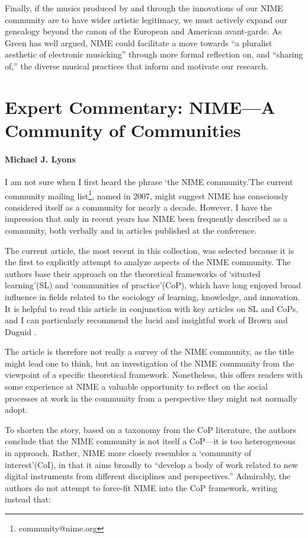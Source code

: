 Finally, if the musics produced by and through the innovations of our NIME community are to have wider artistic legitimacy, we must actively expand our genealogy beyond the canon of the European and American avant-garde. As Green \cite{Green:2015} has well argued, NIME could facilitate a move towards ``a pluralist aesthetic of electronic musicking'' through more formal reflection on, and ``sharing of,'' the diverse musical practices that inform and motivate our research.

\section*{Expert Commentary: NIME---A Community of Communities}
\paragraph{Michael J. Lyons}

I am not sure when I first heard the phrase \lq the NIME community.\rq The current community mailing list\footnote{community@nime.org}, named in 2007, might suggest NIME has consciously considered itself as a community for nearly a decade. However, I have the impression that only in recent years has NIME been frequently described as a community, both verbally and in articles published at the conference. 

The current article, the most recent in this collection, was selected because it is the first to explicitly attempt to analyze aspects of the NIME community. The authors base their approach on the theoretical frameworks of \lq situated learning\rq (SL) and \lq communities of practice\rq (CoP), which have long enjoyed broad influence in fields related to the sociology of learning, knowledge, and innovation. It is helpful to read this article in conjunction with key articles on SL and CoPs, and I can particularly recommend the lucid and insightful work of Brown and Duguid \cite{Brown:1989, Brown:1991}.

The article is therefore not really a survey of the NIME community, as the title might lead one to think, but an investigation of the NIME community from the viewpoint of a specific theoretical framework. Nonetheless, this offers readers  with some experience at NIME a valuable opportunity to reflect on the social processes at work in the community from a perspective they might not normally adopt.

To shorten the story, based on a taxonomy from the CoP literature, the authors conclude that the NIME community is not itself a CoP---it is too heterogeneous in approach. Rather, NIME more closely resembles a \lq community of interest\rq (CoI), in that it aims broadly to ``develop a body of work related to new digital instruments from different disciplines and perspectives.'' Admirably, the authors do not attempt to force-fit NIME into the CoP framework, writing instead that:

